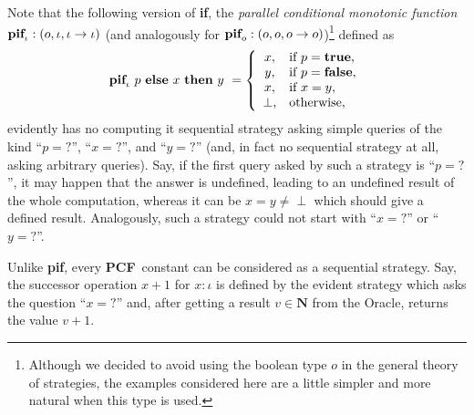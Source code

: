 \documentclass[fleqn]{LMCS}
\theoremstyle{plain}\newtheorem{satz}[thm]{Satz}
\theoremstyle{plain}\newtheorem{hyp}[thm]{Hypothesis}
\theoremstyle{plain}\newtheorem{hyps}[thm]{Hypotheses}
\theoremstyle{definition}\newtheorem{note}[thm]{Note}
\newcommand{\arr}{\rightarrow}
\newcommand{\NN}{\mathbf{N}}
\newcommand{\PCF}{\mbox{\bf PCF}}
\newcommand{\IF}{\mbox{\bf if}}
\newcommand{\PIF}{\mbox{\bf pif}}
\newcommand{\THEN}{\mbox{\bf then}}
\newcommand{\ELSE}{\mbox{\bf else}}
\newcommand{\Undef}{{\perp}}
\newcommand{\?}{\mbox{?}}
\newcommand{\false}{\mbox{\bf false}}
\newcommand{\true}{\mbox{\bf true}}
\begin{document}
Note that the following version of \IF, the
\emph{parallel conditional monotonic function} 
$\PIF_{\iota}:(o,\iota,\iota\arr\iota)$
(and analogously for $\PIF_o:(o,o,o\arr o)$)\footnote{Although we decided to avoid using the boolean type $o$ in 
the general theory of strategies, the examples considered here are a little simpler 
and more natural when this type is used. 
} 
defined as
\[
\PIF_{\iota}\ p\ \ELSE\ x\ \THEN\ y\ = 
\left\{
\begin{array}{cl}
x,      & \mbox{if } p=\true,\\
y,      & \mbox{if } p=\false,\\
x,      & \mbox{if } x=y,\\
\Undef, & \mbox{otherwise},
\end{array}
\right.
\] 
evidently has no computing it sequential strategy asking simple queries 
of the kind ``$p =\?$'', ``$x =\?$'', and ``$y =\?$'' (and, in fact 
no sequential strategy at all, asking arbitrary queries). 
Say, if the first query asked by such a strategy is ``$p =\?$'', 
it may happen that the answer is undefined, leading to an undefined 
result of the whole computation, whereas it can be $x=y\ne\Undef$ which should 
give a defined result. Analogously, such a strategy could not start with 
``$x =\?$'' or ``$y =\?$''. 


Unlike \PIF, every \PCF\ constant 
can be considered as a sequential strategy. 
Say, the successor operation $x+1$ for $x:\iota$ 
is defined by the evident strategy which asks the question ``$x=\?$'' and, 
after getting a result $v\in\NN$ from the Oracle, returns the 
value $v+1$. 
\end{document}
